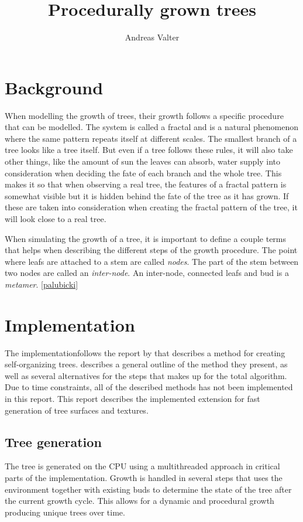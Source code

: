 \documentclass[11pt]{article} %
\title{Procedurally grown trees}
\author{Andreas Valter}
\begin{document}
\maketitle
\section{Background}
When modelling the growth of trees, their growth follows a specific procedure that can be modelled.
The system is called a fractal and is a natural phenomenon where the same pattern repeats itself at different scales.
The smallest branch of a tree looks like a tree itself.
But even if a tree follows these rules, it will also take other things, like the amount of sun the leaves can absorb, water supply into consideration when deciding the fate of each branch and the whole tree.
This makes it so that when observing a real tree, the features of a fractal pattern is somewhat visible but it is hidden behind the fate of the tree as it has grown.
If these are taken into consideration when creating the fractal pattern of the tree, it will look close to a real tree.

When simulating the growth of a tree, it is important to define a couple terms that helps when describing the different steps of the growth procedure.
The point where leafs are attached to a stem are called \emph{nodes}.
The part of the stem between two nodes are called an \emph{inter-node}.
An inter-node, connected leafs and bud is a \emph{metamer}.
\ref{palubicki}

\section{Implementation}
The implementationfollows the report by \citet{palubicki} that describes a method for creating self-organizing trees.
\citet{palubicki} describes a general outline of the method they present, as well as several alternatives for the steps that makes up for the total algorithm.
Due to time constraints, all of the described methods has not been implemented in this report.
This report describes the implemented extension for fast generation of tree surfaces and textures.

\subsection{Tree generation}
The tree is generated on the CPU using a multithreaded approach in critical parts of the implementation.
Growth is handled in several steps that uses the environment together with existing buds to determine the state of the tree after the current growth cycle.
This allows for a dynamic and procedural growth producing unique trees over time.
\end{document}
